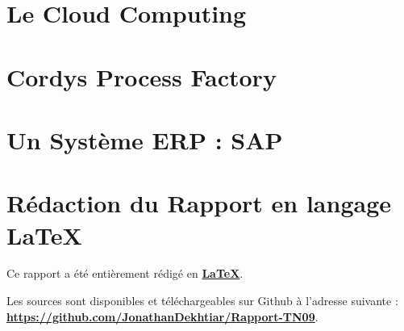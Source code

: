 \documentclass[12pt,a4paper,utf8x, combine]{report}
\begin{document}



\tableofcontents
\listoffigures
\clearpage








\chapter{Le Cloud Computing}


\clearpage

\chapter{Cordys Process Factory}



\clearpage

\chapter{Un Système ERP : SAP}





\clearpage




\nocite{*}
%

%
%

% 

\printindex

\appendix

\pagebreak

\chapter*{Rédaction du Rapport en langage LaTeX}
Ce rapport a été entièrement rédigé en \href{http://fr.wikipedia.org/wiki/LaTeX}{\textbf{LaTeX}}. 

Les sources sont disponibles et téléchargeables sur Github à l'adresse suivante :\\
\href{https://github.com/JonathanDekhtiar/Rapport-TN09}{\textbf{https://github.com/JonathanDekhtiar/Rapport-TN09}}. 
\end{document}
